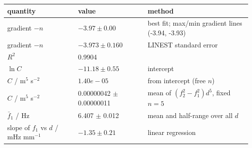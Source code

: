 \begin{tabular}{@{}lll@{}}
\toprule
quantity & value & method \\
\midrule
gradient $-n$ & $-3.97 \pm 0.00$ & best fit; max/min gradient lines (-3.94, -3.93) \\
gradient $-n$ & $-3.973 \pm 0.160$ & LINEST standard error \\
$R^2$ & 0.9904 & \\
$\ln C$ & $-11.18 \pm 0.55$ & intercept \\
$C$ / m$^5$ s$^{-2}$ & $1.40e-05$ & from intercept (free $n$) \\
$C$ / m$^5$ s$^{-2}$ & 0.00000042 $\pm$ 0.00000011 & mean of $(f_2^2-f_1^2)d^5$, fixed $n=5$ \\
$\bar f_1$ / Hz & 6.407 $\pm$ 0.012 & mean and half-range over all $d$ \\
slope of $f_1$ vs $d$ / mHz mm$^{-1}$ & $-1.35 \pm 0.21$ & linear regression \\
\bottomrule
\end{tabular}